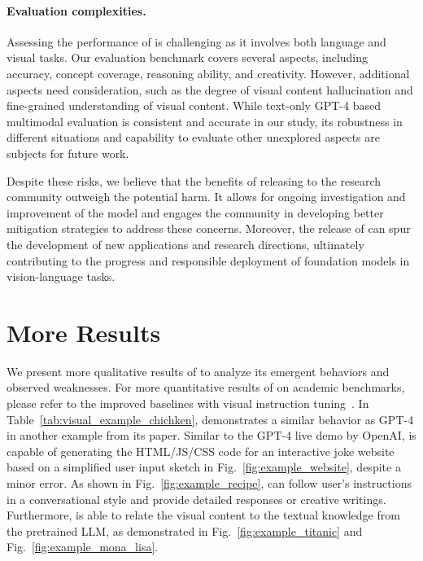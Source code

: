 \paragraph{Evaluation complexities.}
Assessing the performance of \shortname{} is challenging as it involves both language and visual tasks. Our evaluation benchmark covers several aspects, including accuracy, concept coverage, reasoning ability, and creativity. However, additional aspects need consideration, such as the degree of visual content hallucination and fine-grained understanding of visual content. While text-only GPT-4 based multimodal evaluation is consistent and accurate in our study, its robustness in different situations and capability to evaluate other unexplored aspects are subjects for future work.

Despite these risks, we believe that the benefits of releasing \shortname{} to the research community outweigh the potential harm. It allows for ongoing investigation and improvement of the model and engages the community in developing better mitigation strategies to address these concerns. Moreover, the release of \shortname{} can spur the development of new applications and research directions, ultimately contributing to the progress and responsible deployment of foundation models in vision-language tasks.

\section{More Results}

We present more qualitative results of \shortname{} to analyze its emergent behaviors and observed weaknesses. For more quantitative results of \shortname{} on academic benchmarks, please refer to the improved baselines with visual instruction tuning~\cite{liu2023improvedllava}. In Table~\ref{tab:visual_example_chichken}, \shortname{} demonstrates a similar behavior as GPT-4 in another example from its paper.  Similar to the GPT-4 live demo by OpenAI, \shortname{} is capable of generating the HTML/JS/CSS code for an interactive joke website based on a simplified user input sketch in Fig.~\ref{fig:example_website}, despite a minor error. As shown in Fig.~\ref{fig:example_recipe}, \shortname{} can follow user's instructions in a conversational style and provide detailed responses or creative writings. Furthermore, \shortname{} is able to relate the visual content to the textual knowledge from the pretrained LLM, as demonstrated in Fig.~\ref{fig:example_titanic} and Fig.~\ref{fig:example_mona_lisa}.

